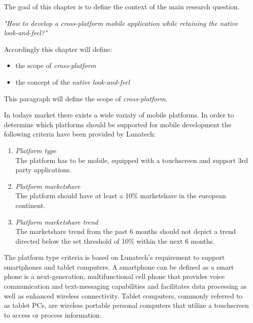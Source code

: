 The goal of this chapter is to define the context of the main research question.

\indent \emph{"How to develop a cross-platform mobile application while retaining the native look-and-feel?"}

\noindent Accordingly this chapter will define:
\begin{itemize}
\item the scope of \emph{cross-platform}
\item the concept of the \emph{native look-and-feel}
\end{itemize}

This paragraph will define the scope of \emph{cross-platform}.

In todays market there exists a wide variaty of mobile platforms. In order to determine which platforms should be supported for mobile development the following criteria have been provided by Lunatech:

\begin{enumerate}
\item \emph{Platform type}\\
The platform has to be mobile, equipped with a touchscreen and support 3rd party applications. %
\item \emph{Platform marketshare}\\
The platform should have at least a 10\% marketshare in the european continent.
\item \emph{Platform marketshare trend}\\
The marketshare trend from the past 6 months should not depict a trend directed below the set threshold of 10\% within the next 6 months.
\end{enumerate}

The platform type criteria is based on Lunatech's requirement to support smartphones and tablet computers. A smartphone can be defined as a smart phone is a next-generation, multifunctional cell phone that provides voice communication and text-messaging capabilities and facilitates data processing as well as enhanced wireless connectivity.\cite{Ni2006} Tablet computers, commonly referred to as tablet PCs, are wireless portable personal computers that utilize a touchscreen to access or process information. \cite{Leigh2011}



